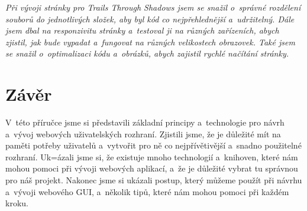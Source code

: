 \textit{Při vývoji stránky pro Trails Through Shadows jsem se snažil o~správné rozdělení souborů do jednotlivých složek, aby byl kód co nejpřehlednější a~udržitelný. Dále jsem dbal na responzivitu stránky a~testoval ji na různých zařízeních, abych zjistil, jak bude vypadat a~fungovat na různých velikostech obrazovek. Také jsem se snažil o~optimalizaci kódu a~obrázků, abych zajistil rychlé načítání stránky.}

\section{Závěr}
\label{sec:conclusion}

V~této příručce jsme si představili základní principy a~technologie pro návrh a~vývoj webových uživatelských rozhraní. Zjistili jsme, že je důležité mít na paměti potřeby uživatelů a~vytvořit pro ně co nejpřívětivější a~snadno použitelné rozhraní. Uk=ázali jsme si, že existuje mnoho technologií a~knihoven, které nám mohou pomoci při vývoji webových aplikací, a~že je důležité vybrat tu správnou pro náš projekt. Nakonec jsme si ukázali postup, který můžeme použít při návrhu a~vývoji webového GUI, a~několik tipů, které nám mohou pomoci při každém kroku.